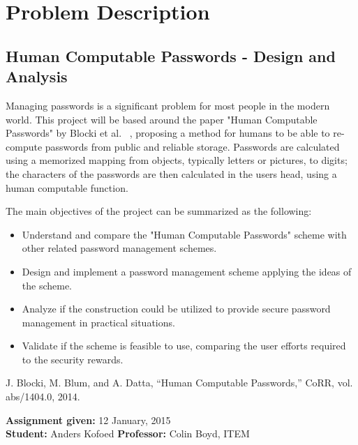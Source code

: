 \chapter*{Problem Description}
\section*{Human Computable Passwords - Design and Analysis}
Managing passwords is a significant problem for most people in the modern world. This project will be based around the paper "Human Computable Passwords" by Blocki et al. ~\cite{hcp-blocki}, proposing a method for humans to be able to re-compute passwords from public and reliable storage. Passwords are calculated using a memorized mapping from objects, typically letters or pictures, to digits; the characters of the passwords are then calculated in the users head, using a human computable function.
\par The main objectives of the project can be summarized as the following:

\begin{itemize}
    \item Understand and compare the "Human Computable Passwords" scheme with other related password management schemes.
    \item Design and implement a password management scheme applying the ideas of the scheme.
    \item Analyze if the construction could be utilized to provide secure password management in practical situations.
    \item Validate if the scheme is feasible to use, comparing the user efforts required to the security rewards.

\end{itemize}

\noindent
\cite{hcp-blocki} J. Blocki, M. Blum, and A. Datta, “Human Computable Passwords,” CoRR, vol. abs/1404.0, 2014.

\noindent
\textbf{Assignment given: }12 January, 2015 \\
\textbf{Student: }Anders Kofoed \hfill \textbf{Professor: }Colin Boyd, ITEM \\

